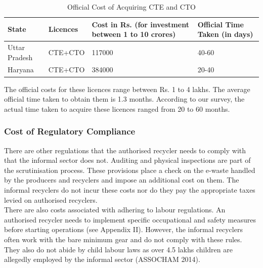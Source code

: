 \documentclass[a4paper, 12pt]{article}
\begin{document}
        \begin{table}[htbp]
          \centering
          \caption{Official Cost of Acquiring CTE and CTO}
            \begin{tabular}{llll}
            \multicolumn{1}{p{5em}}{State} & \multicolumn{1}{p{5em}}{Licences} & \multicolumn{1}{p{12.585em}}{Cost in Rs. (for investment between 1 to 10 crores)} & \multicolumn{1}{p{7.165em}}{Official Time Taken (in days)} \\
            \midrule
            Uttar Pradesh  & CTE+CTO  & 117000 & 40-60 \\
            Haryana & CTE+CTO  & 384000 & 20-40 \\
            \end{tabular}%
          \label{tab:addlabel}%
        \end{table}%
                    
                    
                    
                    The official costs for these licences range between Rs. 1 to 4 lakhs. The average official time taken to obtain them is 1.3 months. According to our survey, the actual time taken to acquire these licences ranged from 20 to 60 months.\\
                    
                    \subsubsection{Cost of Regulatory Compliance}
                    
                    There are other regulations that the authorised recycler needs to comply with that the informal sector does not. Auditing and physical inspections are part of the scrutinisation process. These provisions place a check on the e-waste handled by the producers and recyclers and impose an additional cost on them. The informal recyclers do not incur these costs nor do they pay the appropriate taxes levied on authorised recyclers. \\
                    
                    There are also costs associated with adhering to labour regulations. An authorised recycler needs to implement specific occupational and safety measures before starting operations (see Appendix II). However, the informal recyclers often work with the bare minimum gear and do not comply with these rules. They also do not abide by child labour laws as over 4.5 lakhs children are allegedly employed by the informal sector (ASSOCHAM 2014).\\
                    
\end{document}
